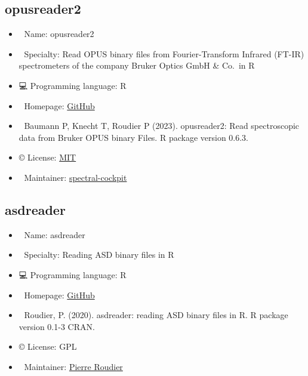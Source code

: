 \documentclass[
  letterpaper,
  DIV=11,
  numbers=noendperiod]{scrreprt}
\providecommand{\tightlist}{%
  \setlength{\itemsep}{0pt}\setlength{\parskip}{0pt}}\usepackage{longtable,booktabs,array}
\begin{document}
\subsection{opusreader2}\label{opusreader2}

\begin{itemize}
\tightlist
\item
  📛 Name: opusreader2\\
\item
  💼 Specialty: Read OPUS binary files from Fourier-Transform Infrared
  (FT-IR) spectrometers of the company Bruker Optics GmbH \& Co.~in R
\item
  💻 Programming language: R\\
\item
  🔗 Homepage:
  \href{https://github.com/spectral-cockpit/opusreader2}{GitHub}\\
\item
  📕 Baumann P, Knecht T, Roudier P (2023). opusreader2: Read
  spectroscopic data from Bruker OPUS binary Files. R package version
  0.6.3.\\
\item
  ©️ License:
  \href{https://github.com/spectral-cockpit/opusreader2/blob/main/LICENSE}{MIT}
\item
  📧 Maintainer:
  \href{https://github.com/spectral-cockpit}{spectral-cockpit}
\end{itemize}

\subsection{asdreader}\label{asdreader}

\begin{itemize}
\tightlist
\item
  📛 Name: asdreader
\item
  💼 Specialty: Reading ASD binary files in R\\
\item
  💻 Programming language: R\\
\item
  🔗 Homepage:
  \href{https://github.com/pierreroudier/asdreader}{GitHub}\\
\item
  📕 Roudier, P. (2020). asdreader: reading ASD binary files in R. R
  package version 0.1-3 CRAN.\\
\item
  ©️ License: GPL\\
\item
  📧 Maintainer: \href{https://github.com/pierreroudier}{Pierre Roudier}
\end{itemize}
\end{document}
